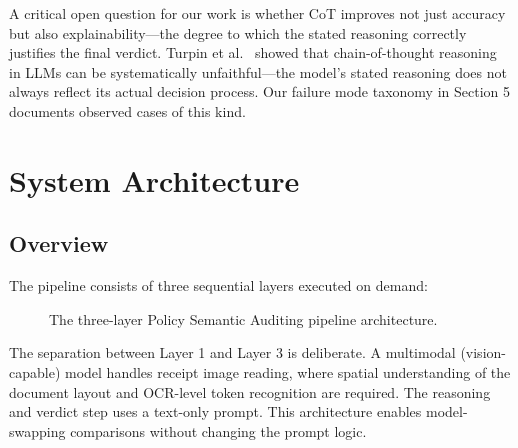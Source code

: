 \documentclass[11pt,a4paper]{article}
\begin{document}
A critical open question for our work is whether CoT improves not just accuracy but also explainability---the degree to which the stated reasoning correctly justifies the final verdict. Turpin et al.~\cite{turpin2023language} showed that chain-of-thought reasoning in LLMs can be systematically unfaithful---the model's stated reasoning does not always reflect its actual decision process. Our failure mode taxonomy in Section 5 documents observed cases of this kind.

\section{System Architecture}

\subsection{Overview}
The pipeline consists of three sequential layers executed on demand:

\begin{figure}[htbp]
\centering
{}
\caption{The three-layer Policy Semantic Auditing pipeline architecture.}
\label{fig:pipeline}
\end{figure}

The separation between Layer 1 and Layer 3 is deliberate. A multimodal (vision-capable) model handles receipt image reading, where spatial understanding of the document layout and OCR-level token recognition are required. The reasoning and verdict step uses a text-only prompt. This architecture enables model-swapping comparisons without changing the prompt logic.
\end{document}
